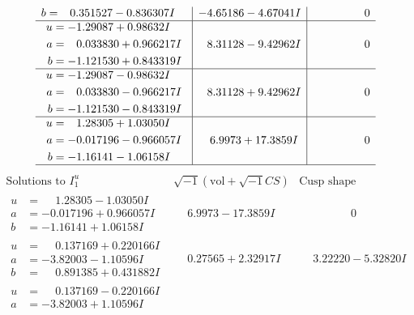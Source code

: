 \documentclass[1p]{elsarticle_modified}
\theoremstyle{definition}
\newcommand{\I}{\sqrt{-1}}
\begin{document}
$$\begin{array}{c|c|c}
\begin{aligned}
b &= \phantom{-}0.351527 - 0.836307 I\end{aligned}
 & -4.65186 - 4.67041 I & \phantom{-0.000000 } 0 \\ \hline\begin{aligned}
u &= -1.29087 + 0.98632 I \\
a &= \phantom{-}0.033830 + 0.966217 I \\
b &= -1.121530 + 0.843319 I\end{aligned}
 & \phantom{-}8.31128 - 9.42962 I & \phantom{-0.000000 } 0 \\ \hline\begin{aligned}
u &= -1.29087 - 0.98632 I \\
a &= \phantom{-}0.033830 - 0.966217 I \\
b &= -1.121530 - 0.843319 I\end{aligned}
 & \phantom{-}8.31128 + 9.42962 I & \phantom{-0.000000 } 0 \\ \hline\begin{aligned}
u &= \phantom{-}1.28305 + 1.03050 I \\
a &= -0.017196 - 0.966057 I \\
b &= -1.16141 - 1.06158 I\end{aligned}
 & \phantom{-}6.9973 + 17.3859 I & \phantom{-0.000000 } 0\\
 \hline 
 \end{array}$$\newpage$$\begin{array}{c|c|c}  
\text{Solutions to }I^u_{1}& \I (\text{vol} + \sqrt{-1}CS) & \text{Cusp shape}\\
 \hline 
\begin{aligned}
u &= \phantom{-}1.28305 - 1.03050 I \\
a &= -0.017196 + 0.966057 I \\
b &= -1.16141 + 1.06158 I\end{aligned}
 & \phantom{-}6.9973 - 17.3859 I & \phantom{-0.000000 } 0 \\ \hline\begin{aligned}
u &= \phantom{-}0.137169 + 0.220166 I \\
a &= -3.82003 - 1.10596 I \\
b &= \phantom{-}0.891385 + 0.431882 I\end{aligned}
 & \phantom{-}0.27565 + 2.32917 I & \phantom{-}3.22220 - 5.32820 I \\ \hline\begin{aligned}
u &= \phantom{-}0.137169 - 0.220166 I \\
a &= -3.82003 + 1.10596 I \\

\end{aligned}
\end{array}$$
\end{document}
